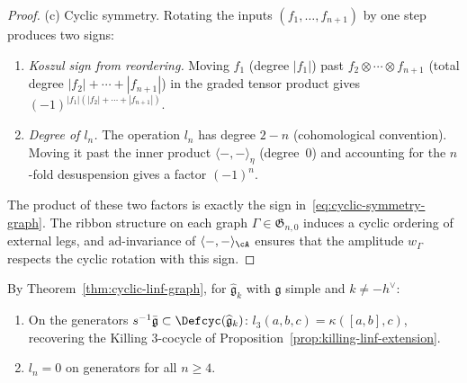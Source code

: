 \begin{proof}
(c)\enspace
Cyclic symmetry. Rotating the inputs $(f_1, \ldots, f_{n+1})$
by one step produces two signs:
\begin{enumerate}
\item \emph{Koszul sign from reordering.} Moving
 $f_1$ (degree $|f_1|$) past
 $f_2 \otimes \cdots \otimes f_{n+1}$
 (total degree $|f_2| + \cdots + |f_{n+1}|$) in the
 graded tensor product gives $(-1)^{|f_1|(|f_2|+\cdots+|f_{n+1}|)}$.
\item \emph{Degree of $l_n$.} The operation $l_n$ has degree
 $2 - n$ (cohomological convention). Moving it past the inner
 product $\langle{-},{-}\rangle_\eta$ (degree~$0$) and
 accounting for the $n$-fold desuspension gives a factor
 $(-1)^n$.
\end{enumerate}
The product of these two factors is exactly the sign
in~\eqref{eq:cyclic-symmetry-graph}. The ribbon structure
on each graph $\Gamma \in \mathfrak{G}_{n,0}$ induces a cyclic
ordering of external legs, and $\mathrm{ad}$-invariance of
$\langle{-},{-}\rangle_\cA$ ensures that the amplitude
$w_\Gamma$ respects the cyclic rotation with this sign.
\end{proof}

\begin{corollary}\label{cor:killing-recovery-graph}
By Theorem~\textup{\ref{thm:cyclic-linf-graph}},
for $\widehat{\mathfrak{g}}_k$ with $\mathfrak{g}$ simple and
$k \neq -h^\vee$:
\begin{enumerate}[label=\textup{(\roman*)}]
\item On the generators
 $s^{-1}\bar{\mathfrak{g}} \subset \Defcyc(\widehat{\mathfrak{g}}_k)$:
 $l_3(a,b,c) = \kappa([a,b],c)$, recovering the Killing $3$-cocycle of
 Proposition~\textup{\ref{prop:killing-linf-extension}}.
\item $l_n = 0$ on generators for all $n \geq 4$.
\end{enumerate}
\end{corollary}

